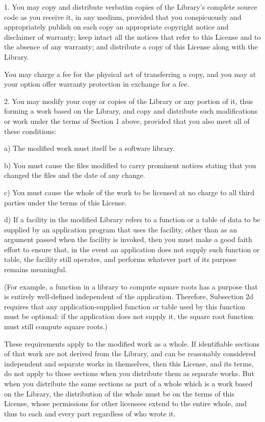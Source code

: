 \documentclass[twoside]{tceusermanual}
\begin{document}
1. You may copy and distribute verbatim copies of the Library's
complete source code as you receive it, in any medium, provided
that you conspicuously and appropriately publish on each copy an
appropriate copyright notice and disclaimer of warranty; keep
intact all the notices that refer to this License and to the
absence of any warranty; and distribute a copy of this License
along with the Library.

You may charge a fee for the physical act of transferring a
copy, and you may at your option offer warranty protection in
exchange for a fee.
 
2. You may modify your copy or copies of the Library or any
portion of it, thus forming a work based on the Library, and
copy and distribute such modifications or work under the terms
of Section 1 above, provided that you also meet all of these
conditions:

    a) The modified work must itself be a software library.

    b) You must cause the files modified to carry prominent notices
    stating that you changed the files and the date of any change.

    c) You must cause the whole of the work to be licensed at no
    charge to all third parties under the terms of this License.

    d) If a facility in the modified Library refers to a function or a
    table of data to be supplied by an application program that uses
    the facility, other than as an argument passed when the facility
    is invoked, then you must make a good faith effort to ensure that,
    in the event an application does not supply such function or
    table, the facility still operates, and performs whatever part of
    its purpose remains meaningful.

    (For example, a function in a library to compute square roots has
    a purpose that is entirely well-defined independent of the
    application.  Therefore, Subsection 2d requires that any
    application-supplied function or table used by this function must
    be optional: if the application does not supply it, the square
    root function must still compute square roots.)

These requirements apply to the modified work as a whole.  If
identifiable sections of that work are not derived from the
Library, and can be reasonably considered independent and
separate works in themselves, then this License, and its terms,
do not apply to those sections when you distribute them as
separate works.  But when you distribute the same sections as
part of a whole which is a work based on the Library, the
distribution of the whole must be on the terms of this License,
whose permissions for other licensees extend to the entire
whole, and thus to each and every part regardless of who wrote
it.
\end{document}
